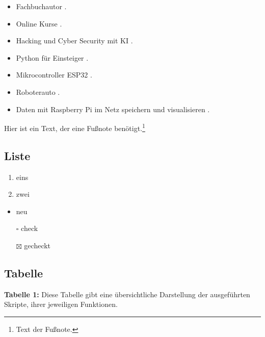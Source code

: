 \documentclass{content/vorlage-design-main}
\begin{document}
\begin{itemize}

\item
  Fachbuchautor \textcite{dalwigk:2024:fachbuchautor}.
\item
  Online Kurse \textcite{schaffranek:2024:kurse}.
\item
  Hacking und Cyber Security mit KI \textcite{dalwigk:2023:hacking}.
\item
  Python für Einsteiger \textcite{dalwigk:2022:python}.
\item
  Mikrocontroller ESP32 \textcite{brandes:2023:mikrocontroller}.
\item
  Roboterauto \textcite{brandes:2022:esp32}.
\item
  Daten mit Raspberry Pi im Netz speichern und visualisieren
  \textcite{brandes:2023:daten}.
\end{itemize}

Hier ist ein Text, der eine Fußnote benötigt.\footnote{Text der Fußnote.}

\subsection{Liste}\label{liste}

\begin{enumerate}
\def\labelenumi{\arabic{enumi}.}

\item
  eins
\item
  zwei
\end{enumerate}

\begin{itemize}

\item
  neu
\item[$\square$]
  check
\item[$\boxtimes$]
  gecheckt
\end{itemize}

\subsection{Tabelle}\label{tabelle}

\textbf{Tabelle 1:} Diese Tabelle gibt eine übersichtliche Darstellung
der ausgeführten Skripte, ihrer jeweiligen Funktionen.
\end{document}
